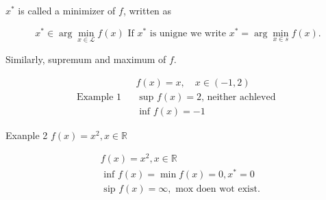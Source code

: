 \documentclass[11pt,a4paper]{article}
\begin{document}
$x^{*}$ is called a minimizer of $f$, written as

$$
x^{*} \in \arg \min _{x \in \mathcal{L}} f(x) {\text { If } x^{*} \text { is unigne we write } x^{*}=\arg \min _{x \in s} f(x).}
$$

Similarly, supremum and maximum of $f$.

$$
\text { Example 1 } \begin{aligned}
& f(x)=x, \quad x \in(-1,2) \\
& \text { sup } f(x)=2 \text {, neither achleved } \\
& \text { inf } f(x)=-1
\end{aligned}
$$

Exanple 2 $f(x)=x^{2}, x \in \mathbb{R}$

$$
\begin{aligned}
&f(x)=x^{2}, x \in \mathbb{R} \\
&\text { inf } f(x)=\min f(x)=0, x^{*}=0 \\
&\text { sip } f(x)=\infty, \text { mox doen wot exist. }
\end{aligned}
$$
\end{document}

